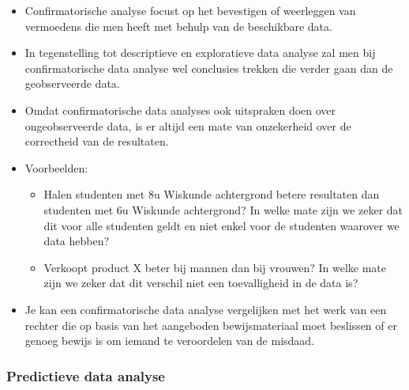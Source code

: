 \documentclass[]{tufte-book}
\providecommand{\tightlist}{%
  \setlength{\itemsep}{0pt}\setlength{\parskip}{0pt}}
\begin{document}
\begin{itemize}
\tightlist
\item
  Confirmatorische analyse focust op het bevestigen of weerleggen van vermoedens die men heeft met behulp van de beschikbare data.
\item
  In tegenstelling tot descriptieve en exploratieve data analyse zal men bij confirmatorische data analyse wel conclusies trekken die verder gaan dan de geobserveerde data.
\item
  Omdat confirmatorische data analyses ook uitspraken doen over ongeobserveerde data, is er altijd een mate van onzekerheid over de correctheid van de resultaten.
\item
  Voorbeelden:

  \begin{itemize}
  \tightlist
  \item
    Halen studenten met 8u Wiskunde achtergrond betere resultaten dan studenten met 6u Wiskunde achtergrond? In welke mate zijn we zeker dat dit voor alle studenten geldt en niet enkel voor de studenten waarover we data hebben?
  \item
    Verkoopt product X beter bij mannen dan bij vrouwen? In welke mate zijn we zeker dat dit verschil niet een toevalligheid in de data is?
  \end{itemize}
\item
  Je kan een confirmatorische data analyse vergelijken met het werk van een rechter die op basis van het aangeboden bewijsmateriaal moet beslissen of er genoeg bewijs is om iemand te veroordelen van de misdaad.
\end{itemize}

\hypertarget{predictieve-data-analyse}{%
\subsubsection*{Predictieve data analyse}\label{predictieve-data-analyse}}
\end{document}

